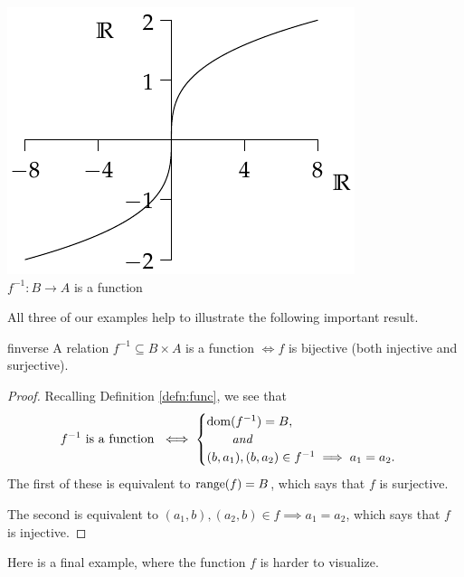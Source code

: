 \begin{examples}{}{}
\begin{enumerate}
\begin{center}
\begin{minipage}{0.35\textwidth}
				\includegraphics[width=\textwidth]{relations-23-reln3}\\
				$f^{-1}:B\to A$ is a function
			\end{minipage}
		\end{center}
	\end{enumerate}
\end{examples}

All three of our examples help to illustrate the following important result.

\begin{thm}{}{finverse}
	A relation $f^{-1}\subseteq B\times A$ is a function $\iff f$ is bijective (both injective and surjective).
\end{thm}

\begin{proof}
	Recalling Definition \ref{defn:func}, we see that
	\[
		f^{-1}\text{ is a function }\iff
		\begin{cases}
			\operatorname{dom}(f^{-1})=B,\\
			\qquad\text{\emph{and}}\\
			(b,a_1),(b,a_2)\in f^{-1}\implies a_1=a_2.
		\end{cases}
	\]
	The first of these is equivalent to $\operatorname{range}(f)=B$, which says that $f$ is surjective.\par
	The second is equivalent to $(a_1,b),(a_2,b)\in f\implies a_1=a_2$, which says that $f$ is injective.
\end{proof}

Here is a final example, where the function $f$ is harder to visualize.

